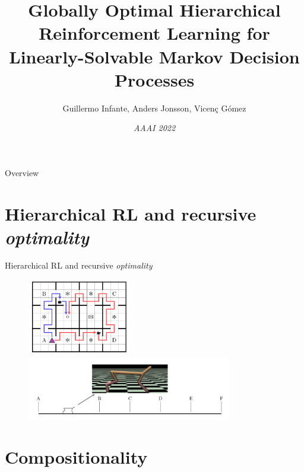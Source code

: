 \documentclass{beamer}
\title[Globally Optimal HRL for LMDPs]{Globally Optimal Hierarchical Reinforcement Learning for Linearly-Solvable Markov Decision Processes}
\author[G. Infante, A. Jonsson, V. Gómez ]{Guillermo Infante, Anders Jonsson, Vicenç Gómez}
\date[]{\textit{AAAI 2022}}
\theoremstyle{mystyle}
\begin{document}
\begin{frame}
    \maketitle
\end{frame}

\begin{frame}{Overview}
    \tableofcontents
\end{frame}

\section{Hierarchical RL and recursive \textit{optimality}}

\begin{frame}{Hierarchical RL and recursive \textit{optimality}}

    \begin{figure}
        \includegraphics[width=0.4\textwidth]{Figures/coffee.png}
        \includegraphics[width=0.8\textwidth]{Figures/cheetah.png}
        \caption*{\citep{Icarte2022}}
    \end{figure}
\end{frame}

\section{Compositionality}
\end{document}
